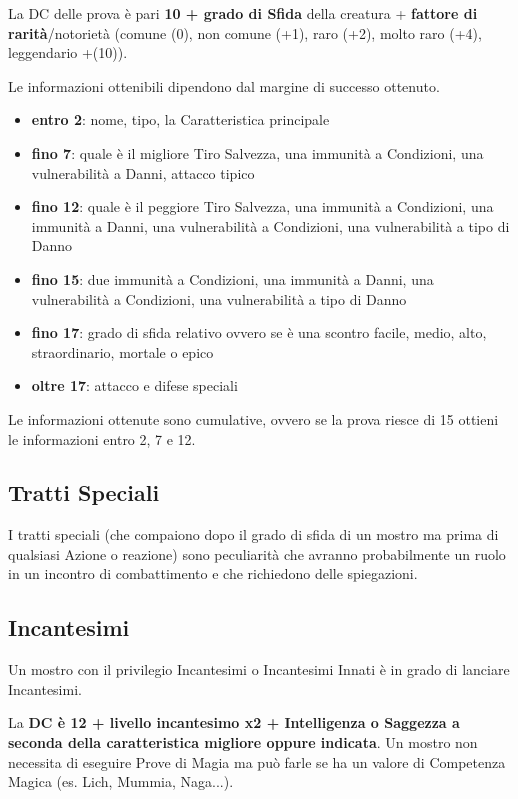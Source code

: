 \begin{multicols}{2}
\medskip

La DC delle prova è pari \textbf{10 + grado di Sfida} della creatura + \textbf{fattore di rarità}/notorietà (comune (0), non comune (+1), raro (+2), molto raro (+4), leggendario +(10)).

Le informazioni ottenibili dipendono dal margine di successo ottenuto.

\noindent\begin{itemize} \setlength{\itemsep}{0pt}
\item \textbf{entro 2}: nome, tipo, la Caratteristica principale
\item \textbf{fino 7}: quale è il migliore Tiro Salvezza, una immunità a Condizioni, una vulnerabilità a Danni, attacco tipico
\item \textbf{fino 12}: quale è il peggiore Tiro Salvezza, una immunità a Condizioni, una immunità a Danni, una vulnerabilità a Condizioni, una vulnerabilità a tipo di Danno
\item \textbf{fino 15}: due immunità a Condizioni, una immunità a Danni, una vulnerabilità a Condizioni, una vulnerabilità a tipo di Danno
\item \textbf{fino 17}: grado di sfida relativo ovvero se è una scontro facile, medio, alto, straordinario, mortale o epico
\item \textbf{oltre 17}: attacco e difese speciali
\end{itemize}

\medskip

Le informazioni ottenute sono cumulative, ovvero se la prova riesce di 15 ottieni le informazioni entro 2, 7 e 12.

\subsection{Tratti Speciali}

I tratti speciali (che compaiono dopo il grado di sfida di un mostro ma prima di qualsiasi Azione o reazione) sono peculiarità che avranno probabilmente un ruolo in un incontro di combattimento e che richiedono delle spiegazioni.

\subsection{Incantesimi}

Un mostro con il privilegio Incantesimi o Incantesimi Innati è in grado di lanciare Incantesimi.

La \textbf{DC è 12 + livello incantesimo x2 + Intelligenza o Saggezza a seconda della caratteristica migliore oppure indicata}. Un mostro non necessita di eseguire Prove di Magia ma può farle se ha un valore di Competenza Magica (es. Lich, Mummia, Naga...).


\end{multicols}
